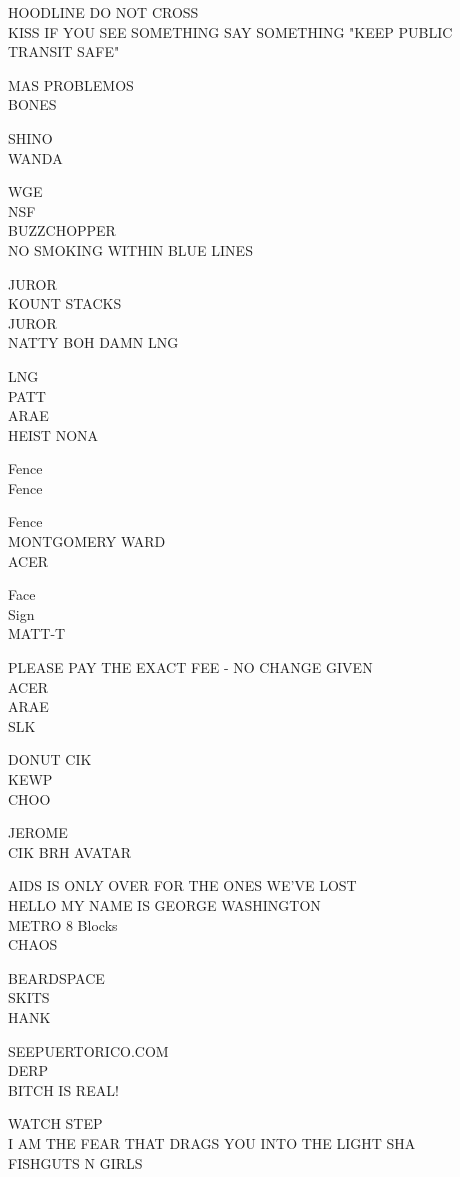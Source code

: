 \documentclass[10pt,letterpaper]{article}
\begin{document}
HOODLINE DO NOT CROSS\\
KISS IF YOU SEE SOMETHING SAY SOMETHING "KEEP PUBLIC TRANSIT SAFE"

MAS PROBLEMOS\\
BONES

SHINO\\
WANDA

WGE\\
NSF\\
BUZZCHOPPER\\
NO SMOKING WITHIN BLUE LINES

JUROR\\
KOUNT STACKS\\
JUROR\\
NATTY BOH DAMN LNG

LNG\\
PATT\\
ARAE\\
HEIST NONA

Fence\\
Fence

Fence\\
MONTGOMERY WARD\\
ACER

Face\\
Sign\\
MATT{-}T

PLEASE PAY THE EXACT FEE {-} NO CHANGE GIVEN\\
ACER\\
ARAE\\
SLK

DONUT CIK\\
KEWP\\
CHOO

JEROME\\
CIK BRH AVATAR

AIDS IS ONLY OVER FOR THE ONES WE'VE LOST\\
HELLO MY NAME IS GEORGE WASHINGTON\\
METRO 8 Blocks\\
CHAOS

BEARDSPACE\\
SKITS\\
HANK

SEEPUERTORICO.COM\\
DERP\\
BITCH IS REAL!

WATCH STEP\\
I AM THE FEAR THAT DRAGS YOU INTO THE LIGHT SHA\\
FISHGUTS N GIRLS
\end{document}
